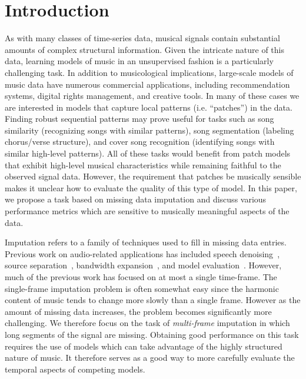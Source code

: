 \documentclass{article}
\newcommand{\FIXME}[2][FIXME]{}%
\begin{document}
\section{Introduction}
\label{sec:intro}
As with many classes of time-series data, musical signals contain
substantial amounts of complex structural information.  Given the
intricate nature of this data, learning models of music in an
unsupervised fashion is a particularly challenging task.  In addition
to musicological implications, large-scale models of music data have
numerous commercial applications, including recommendation systems,
digital rights management, and creative tools.  In many of these cases
we are interested in models that capture local patterns
(i.e. ``patches'') in the data.  Finding robust sequential patterns
may prove useful for tasks such as song similarity (recognizing songs
with similar patterns), song segmentation (labeling chorus/verse
structure), and cover song recognition (identifying songs with similar
high-level patterns).  All of these tasks would benefit from patch
models that exhibit high-level musical characteristics while remaining
faithful to the observed signal data.
However, the requirement that patches be musically sensible makes it
unclear how to evaluate the quality of this type of model.  In this
paper, we propose a task based on missing data imputation and discuss
various performance metrics which are sensitive to musically
meaningful aspects of the data.

Imputation refers to a family of techniques used to fill in missing
data entries.  Previous work on audio-related applications has
included speech denoising~\cite{Cooke1996,Raj1998}, source
separation~\cite{Reyes-Gomez2005}, bandwidth
expansion~\cite{Smaragdis2009}, and model
evaluation~\cite{Hoffman2010}.  However, much of the previous work has
focused on at most a single time-frame.
The single-frame imputation problem is often somewhat easy since the
harmonic content of music tends to change more slowly than a single
frame.  However as the amount of missing data increases, the problem
becomes significantly more challenging.
%
We therefore focus on the task of \emph{multi-frame} imputation in
which long segments of the signal are missing.
%
Obtaining good performance on this task requires the use of models
which can take advantage of the highly structured nature of music.  It
therefore serves as a good way to
more carefully evaluate the temporal aspects of competing
models.  %
\end{document}
